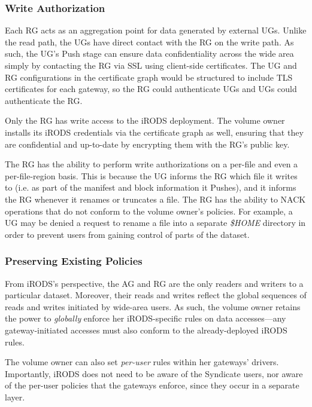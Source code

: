 \subsubsection{Write Authorization}

Each RG acts as an aggregation point for data generated by external UGs.
Unlike the read path, the UGs have direct contact with the RG on the write path.
As such, the UG's Push stage can ensure data confidentiality across the wide
area simply by contacting the RG via SSL using client-side certificates.  The UG and RG configurations in the
certificate graph would be structured to include TLS certificates for each
gateway, so the RG could authenticate UGs and UGs could authenticate the RG.

Only the RG has write access to the iRODS deployment.  The volume owner installs its
iRODS credentials via the certificate graph as well, ensuring that they are
confidential and up-to-date by encrypting them with the RG's public key.

The RG has the ability to perform write authorizations on a per-file and even a
per-file-region basis.  This is because the UG informs the RG which file it
writes to (i.e. as part of the manifest and block information it Pushes), and it
informs the RG whenever it renames or truncates a file.  The RG has the ability
to NACK operations that do not conform to the volume owner's policies.  For
example, a UG may be denied a request to rename a file into a separate
\textit{\$HOME} directory in order to prevent users from gaining control of
parts of the dataset.

\subsubsection{Preserving Existing Policies}

From iRODS's perspective, the AG and RG are the only readers and writers to a
particular dataset.  Moreover, their reads and writes reflect the global
sequences of reads and writes initiated by wide-area users.  As such, the
volume owner retains the power to \emph{globally} enforce her iRODS-specific rules on data
accesses---any gateway-initiated accesses must also conform to the
already-deployed iRODS rules.

The volume owner can also set \emph{per-user} rules within her
gateways' drivers.  Importantly, iRODS does not need to be aware of the
Syndicate users, nor aware of the per-user policies that the gateways enforce,
since they occur in a separate layer.


